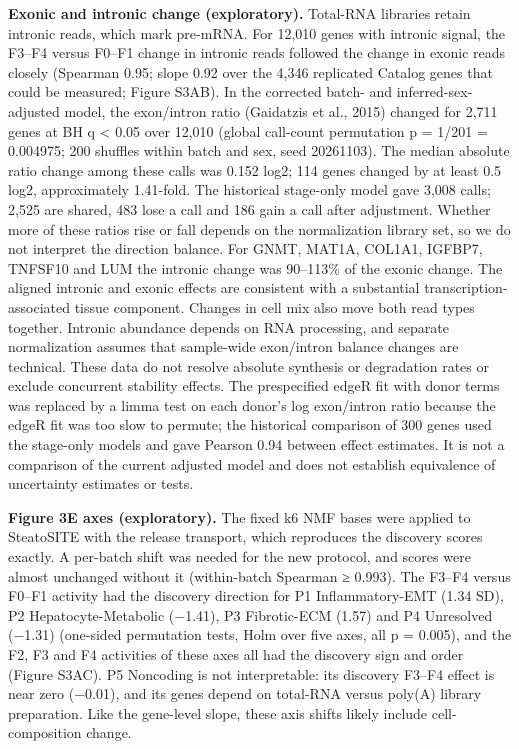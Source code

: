 \textbf{Exonic and intronic change (exploratory).} Total-RNA libraries retain intronic reads, which mark pre-mRNA. For 12,010 genes with intronic signal, the F3--F4 versus F0--F1 change in intronic reads followed the change in exonic reads closely (Spearman 0.95; slope 0.92 over the 4,346 replicated Catalog genes that could be measured; Figure S3AB). In the corrected batch- and inferred-sex-adjusted model, the exon/intron ratio (Gaidatzis et al., 2015) changed for 2,711 genes at BH q \textless{} 0.05 over 12,010 (global call-count permutation p = 1/201 = 0.004975; 200 shuffles within batch and sex, seed 20261103). The median absolute ratio change among these calls was 0.152 log2; 114 genes changed by at least 0.5 log2, approximately 1.41-fold. The historical stage-only model gave 3,008 calls; 2,525 are shared, 483 lose a call and 186 gain a call after adjustment. Whether more of these ratios rise or fall depends on the normalization library set, so we do not interpret the direction balance. For GNMT, MAT1A, COL1A1, IGFBP7, TNFSF10 and LUM the intronic change was 90--113\% of the exonic change. The aligned intronic and exonic effects are consistent with a substantial transcription-associated tissue component. Changes in cell mix also move both read types together. Intronic abundance depends on RNA processing, and separate normalization assumes that sample-wide exon/intron balance changes are technical. These data do not resolve absolute synthesis or degradation rates or exclude concurrent stability effects. The prespecified edgeR fit with donor terms was replaced by a limma test on each donor's log exon/intron ratio because the edgeR fit was too slow to permute; the historical comparison of 300 genes used the stage-only models and gave Pearson 0.94 between effect estimates. It is not a comparison of the current adjusted model and does not establish equivalence of uncertainty estimates or tests.

\textbf{Figure 3E axes (exploratory).} The fixed k6 NMF bases were applied to SteatoSITE with the release transport, which reproduces the discovery scores exactly. A per-batch shift was needed for the new protocol, and scores were almost unchanged without it (within-batch Spearman ≥ 0.993). The F3--F4 versus F0--F1 activity had the discovery direction for P1 Inflammatory-EMT (1.34 SD), P2 Hepatocyte-Metabolic (−1.41), P3 Fibrotic-ECM (1.57) and P4 Unresolved (−1.31) (one-sided permutation tests, Holm over five axes, all p = 0.005), and the F2, F3 and F4 activities of these axes all had the discovery sign and order (Figure S3AC). P5 Noncoding is not interpretable: its discovery F3--F4 effect is near zero (−0.01), and its genes depend on total-RNA versus poly(A) library preparation. Like the gene-level slope, these axis shifts likely include cell-composition change.

